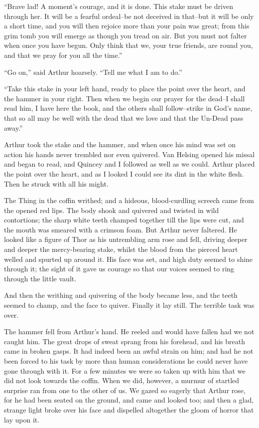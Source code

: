 \documentclass[12pt,openright]{book}
\begin{document}
“Brave lad! A moment’s courage, and it is done. This stake must be driven through her. It will be a fearful ordeal–be not deceived in that–but it will be only a short time, and you will then rejoice more than your pain was great; from this grim tomb you will emerge as though you tread on air. But you must not falter when once you have begun. Only think that we, your true friends, are round you, and that we pray for you all the time.”

“Go on,” said Arthur hoarsely. “Tell me what I am to do.”

“Take this stake in your left hand, ready to place the point over the heart, and the hammer in your right. Then when we begin our prayer for the dead–I shall read him, I have here the book, and the others shall follow–strike in God’s name, that so all may be well with the dead that we love and that the Un-Dead pass away.”

Arthur took the stake and the hammer, and when once his mind was set on action his hands never trembled nor even quivered. Van Helsing opened his missal and began to read, and Quincey and I followed as well as we could. Arthur placed the point over the heart, and as I looked I could see its dint in the white flesh. Then he struck with all his might.

The Thing in the coffin writhed; and a hideous, blood-curdling screech came from the opened red lips. The body shook and quivered and twisted in wild contortions; the sharp white teeth champed together till the lips were cut, and the mouth was smeared with a crimson foam. But Arthur never faltered. He looked like a figure of Thor as his untrembling arm rose and fell, driving deeper and deeper the mercy-bearing stake, whilst the blood from the pierced heart welled and spurted up around it. His face was set, and high duty seemed to shine through it; the sight of it gave us courage so that our voices seemed to ring through the little vault.

And then the writhing and quivering of the body became less, and the teeth seemed to champ, and the face to quiver. Finally it lay still. The terrible task was over.

The hammer fell from Arthur’s hand. He reeled and would have fallen had we not caught him. The great drops of sweat sprang from his forehead, and his breath came in broken gasps. It had indeed been an awful strain on him; and had he not been forced to his task by more than human considerations he could never have gone through with it. For a few minutes we were so taken up with him that we did not look towards the coffin. When we did, however, a murmur of startled surprise ran from one to the other of us. We gazed so eagerly that Arthur rose, for he had been seated on the ground, and came and looked too; and then a glad, strange light broke over his face and dispelled altogether the gloom of horror that lay upon it.
\end{document}
